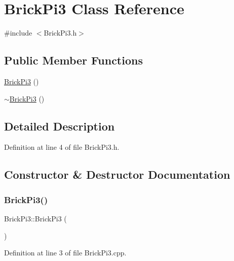 \hypertarget{class_brick_pi3}{}\section{Brick\+Pi3 Class Reference}
\label{class_brick_pi3}


{\ttfamily \#include $<$Brick\+Pi3.\+h$>$}

\subsection*{Public Member Functions}
\begin{DoxyCompactItemize}
\item 
\mbox{\hyperlink{class_brick_pi3_abd966c52f01fcc176bf613bd993ea793}{Brick\+Pi3}} ()
\item 
\mbox{\hyperlink{class_brick_pi3_a94cb50dd4a9099ad9abf90d43977f3b9}{$\sim$\+Brick\+Pi3}} ()
\end{DoxyCompactItemize}


\subsection{Detailed Description}


Definition at line 4 of file Brick\+Pi3.\+h.



\subsection{Constructor \& Destructor Documentation}
\mbox{\label{class_brick_pi3_abd966c52f01fcc176bf613bd993ea793}} 
\subsubsection{\texorpdfstring{Brick\+Pi3()}{BrickPi3()}}
{\footnotesize\ttfamily Brick\+Pi3\+::\+Brick\+Pi3 (\begin{DoxyParamCaption}{ }\end{DoxyParamCaption})}



Definition at line 3 of file Brick\+Pi3.\+cpp.

\mbox{\label{class_brick_pi3_a94cb50dd4a9099ad9abf90d43977f3b9}} 

